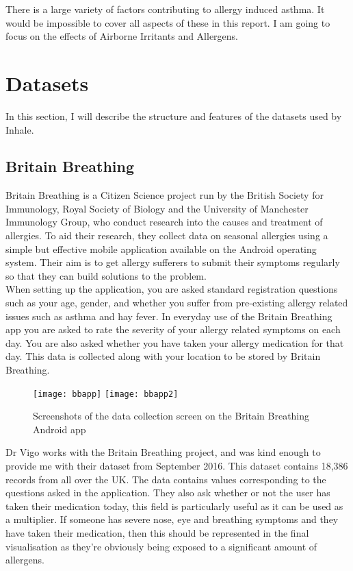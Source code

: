 There is a large variety of factors contributing to allergy induced asthma. It would be impossible to cover all aspects of these in this report. I am going to focus on the effects of Airborne Irritants and Allergens.


\section{Datasets}

In this section, I will describe the structure and features of the datasets used by Inhale.\\

\subsection{Britain Breathing}

Britain Breathing is a Citizen Science project run by the British Society for Immunology, Royal Society of Biology and the University of Manchester Immunology Group, who conduct research into the causes and treatment of allergies. To aid their research, they collect data on seasonal allergies using a simple but effective mobile application available on the Android operating system. Their aim is to get allergy sufferers to submit their symptoms regularly so that they can build solutions to the problem.\\

When setting up the application, you are asked standard registration questions such as your age, gender, and whether you suffer from pre-existing allergy related issues such as asthma and hay fever. In everyday use of the Britain Breathing app you are asked to rate the severity of your allergy related symptoms on each day. You are also asked whether you have taken your allergy medication for that day. This data is collected along with your location to be stored by Britain Breathing.

\begin{figure}[H]
\begin{center}
\texttt{[image: bbapp]}
\texttt{[image: bbapp2]}
\caption{Screenshots of the data collection screen on the Britain Breathing Android app}
\label{fig:bbscrn}
\end{center}
\end{figure}

Dr Vigo works with the Britain Breathing project, and was kind enough to provide me with their dataset from September 2016. This dataset contains 18,386 records from all over the UK. The data contains values corresponding to the questions asked in the application. They also ask whether or not the user has taken their medication today, this field is particularly useful as it can be used as a multiplier. If someone has severe nose, eye and breathing symptoms and they have taken their medication, then this should be represented in the final visualisation as they're obviously being exposed to a significant amount of allergens.\\

